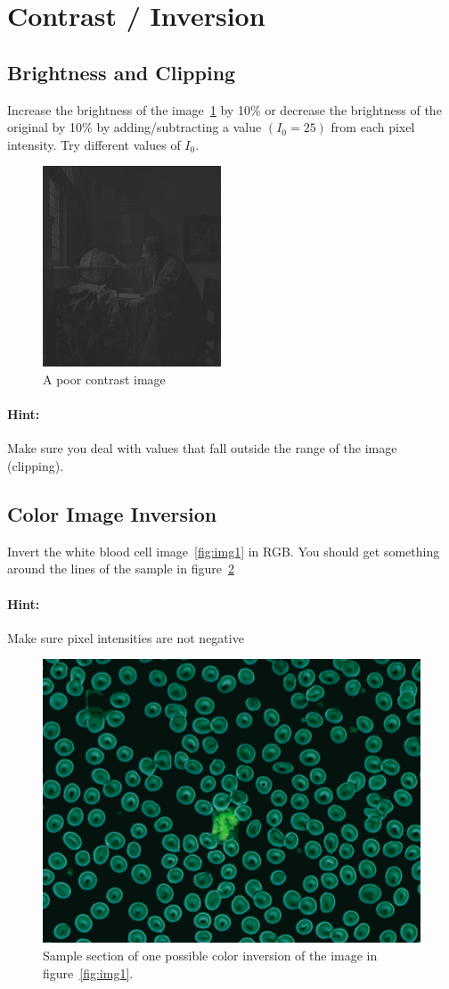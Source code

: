 \documentclass[a4paper]{article}
\begin{document}
\section{Contrast / Inversion}

\subsection{Brightness and Clipping} Increase the brightness of the image~\ref{fig:img3} by 10\% 
or decrease the brightness of the original by 10\% by adding/subtracting a value
$(I_0=25)$ from each pixel intensity. Try different values of $I_0$.

\begin{figure}
\centering
\includegraphics{figs/ImageA.jpg}%
\caption{%
A poor contrast image
}\label{fig:img3}
\end{figure}

\paragraph{Hint:} Make sure you deal with values that fall outside the range of
the image (clipping).

\subsection{Color Image Inversion} Invert the white blood cell
image~\ref{fig:img1} in RGB. You should get something around the lines of
the sample in figure~\ref{fig:img4}
\paragraph{Hint:} Make sure pixel intensities are not negative
\begin{figure}
\centering
\includegraphics[trim=40mm 40mm 40mm 40mm, clip, width=0.5\linewidth]{figs/white_blood_cells-inverted.png}%
\caption{%
Sample section of one possible color inversion of the image in figure~\ref{fig:img1}.
}\label{fig:img4}
\end{figure}
\end{document}
